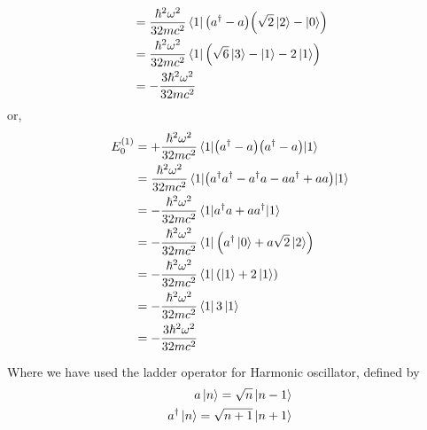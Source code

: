 \begin{enumerate}[label=Problem.\arabic*,start=1]
\begin{align*}
				&= \frac{\hbar^2 \omega^2}{32 m c^2} \bra{1}\qty(a^\dagger - a) \qty(\sqrt{2}\ket{2} - \ket{0}) \\
				&= \frac{\hbar^2 \omega^2}{32 m c^2} \bra{1} \qty(\sqrt{6}\ket{3} -\ket{1} - 2 \ket{1}) \\
				&= -\frac{3\hbar^2 \omega^2}{32 m c^2}
			\end{align*}
			or,
			\begin{align*}
				E_0^{(1)}  
				&= + \frac{\hbar^2 \omega^2}{32 m c^2} \expval{\qty(a^{\dagger} - a)\qty(a^{\dagger} - a)}{1} \\
				&= \frac{\hbar^2 \omega^2}{32 m c^2}\expval{\qty(a^{\dagger}a^{\dagger} -a^{\dagger} a - a a^{\dagger} + a a)}{1} \\
				&= - \frac{\hbar^2 \omega^2}{32 m c^2} \expval{a^{\dagger} a + a a^{\dagger}}{1} \\
				&= - \frac{\hbar^2 \omega^2}{32 m c^2} \bra{1} \qty(a^\dagger \ket{0} + a \sqrt{2}\ket{2}) \\
				&= - \frac{\hbar^2 \omega^2}{32 m c^2} \bra{1} \qty(\ket{1} + 2\ket{1}) \\
				&= - \frac{\hbar^2 \omega^2}{32 m c^2} \bra{1} 3\ket{1}\\
				&= - \frac{3 \hbar^2 \omega^2}{32 m c^2}
			\end{align*}
			
			Where we have used the ladder operator for Harmonic oscillator, defined by
			\begin{align*}
				a\ket{n} = \sqrt{n} \ket{n - 1} \\
				a^\dagger\ket{n} = \sqrt{n+1} \ket{n+1} \\
			\end{align*}
			
			
			

\end{enumerate}
